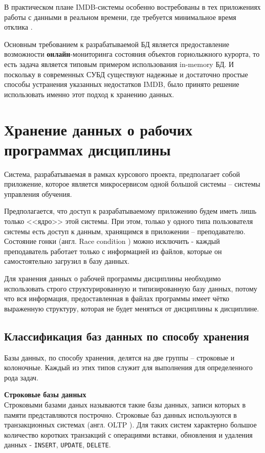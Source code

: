 В практическом плане IMDB-системы особенно востребованы в тех приложениях работы с данными в реальном времени, где требуется минимальное время отклика \cite{lookslike}.

Основным требованием к разрабатываемой БД является предоставление возможности \textbf{онлайн}-мониторинга состояния объектов горнолыжного курорта, то есть задача является типовым примером использования in-memory БД. И поскольку в современных СУБД существуют надежные и достаточно простые способы устранения указанных недостатков IMDB, было принято решение использовать именно этот подход к хранению данных.





\section{Хранение данных о рабочих программах дисциплины}

Система, разрабатываемая в рамках курсового проекта, предполагает собой приложение, которое является микросервисом \cite{microservice} одной большой системы -- системы управления обучения. 

Предполагается, что доступ к разрабатываемому приложению будем иметь лишь только <<ядро>> этой системы. При этом, только у одного типа пользователя системы есть доступ к данным, хранящимся в приложении -- преподавателю. Состояние гонки (англ. Race condition \cite{race-condition}) можно исключить - каждый преподаватель работает только с информацией из файлов, которые он самостоятельно загрузил в базу данных.

Для хранения данных о рабочей программы дисциплины необходимо использовать строго структурированную и типизированную базу данных, потому что вся информация, предоставленная в файлах программы имеет чётко выраженную структуру, которая не будет меняться от дисциплины к дисциплине.

\subsection{Классификация баз данных по способу хранения}

Базы данных, по способу хранения, делятся на две группы -- строковые и колоночные. Каждый из этих типов служит для выполнения для определенного рода задач.

\noindent\textbf{Строковые базы данных}\\

Строковыми базами даных называются такие базы данных, записи которых в памяти представляются построчно. Строковые баз данных используются в транзакционных системах (англ. OLTP \cite{OLTP}). Для таких систем характерно большое количество коротких транзакций с операциями вставки, обновления и удаления данных - \texttt{INSERT}, \texttt{UPDATE}, \texttt{DELETE}. 

